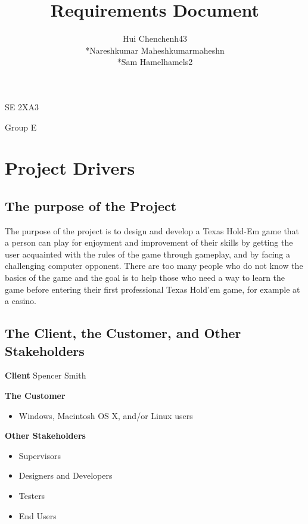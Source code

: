 \documentclass[12pt]{article}
\begin{document}
	\begin{titlepage}
	\title {Requirements Document}
	\maketitle
		\begin{center}
		SE 2XA3\\
		\author{
		Hui Chen\hspace{128pt}chenh43	
		\\*Nareshkumar Maheshkumar\hspace{35pt}maheshn 
		\\*Sam Hamel\hspace{118pt}hamels2 \\
		}

		Group E
		\end{center}
	\end{titlepage}
	
	\newpage
	\tableofcontents
	\listoffigures
	\listoftables

	\newpage
	\section{Project Drivers}
	\subsection{The purpose of the Project}
	The purpose of the project is to design and develop a Texas Hold-Em game that a person 		can play for enjoyment and improvement of their skills by getting the user acquainted 		with the rules of the game through gameplay, and by facing a challenging computer 			opponent. There are too many people who do not know the basics of the game and the goal 	is to help those who need a way to learn the game before entering their first 				professional Texas Hold'em game, for example at a casino.
	\subsection{The Client, the Customer, and Other Stakeholders}
	\textbf{Client}
	Spencer Smith
	
	\textbf{The Customer}
	\begin{itemize}
	\item Windows, Macintosh OS X, and/or Linux users
	\end{itemize}
	
	\textbf{Other Stakeholders}
	\begin{itemize}
	\item Supervisors
	\item Designers and Developers
	\item Testers
	\item End Users
	\end{itemize}
\end{document}
